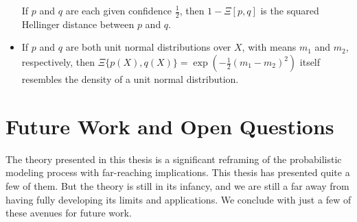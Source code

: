 \begin{itemize}
        If $p$ and $q$ are each given confidence $\frac12$, then $1-\Xi[p,q]$ is the squared Hellinger distance between $p$ and $q$. 

    \item 
        If $p$ and $q$ are both unit normal distributions over $X$, 
        with means $m_1$ and $m_2$, respectively, then
        $\Xi\{ p(X), q(X) \} = \exp( - \frac12 (m_1 - m_2)^2)$
        itself resembles the density of a unit normal distribution.        
\end{itemize}


\section{Future Work and Open Questions}

The theory presented in this thesis is a significant reframing of the probabilistic modeling process with far-reaching implications.
This thesis has presented quite a few of them. 
But the theory is still in its infancy, 
    and we are still a far away from having fully developing its limits and applications. 
We conclude with just a few of these avenues for future work.

